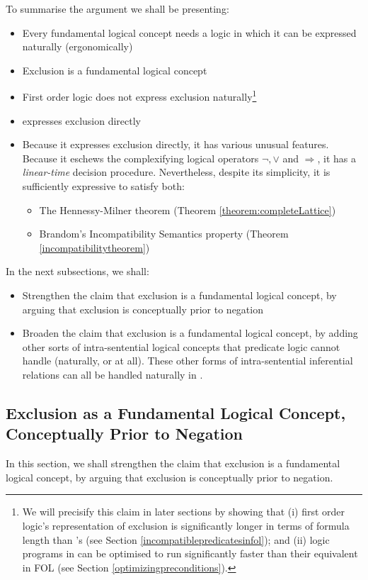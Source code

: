 To summarise the argument we shall be presenting:
\begin{itemize}
\item
Every fundamental logical concept needs a logic in which it can be expressed naturally (ergonomically)
\item
Exclusion is a fundamental logical concept
\item
First order logic does not express exclusion naturally\footnote{We will precisify this claim in later sections by showing that (i) first order logic's representation of exclusion is significantly longer in terms of formula length than \ELFULL{}'s (see Section \ref{incompatiblepredicatesinfol}); and (ii) logic programs in \ELFULL{} can be optimised to run significantly faster than their equivalent in FOL (see Section \ref{optimizingpreconditions}).}
\item
\ELFULL{} expresses exclusion directly
\item
Because it expresses exclusion directly, it has various unusual features. 
Because it eschews the complexifying logical operators $\neg, \lor$ and $\Rightarrow$, it has a \emph{linear-time} decision procedure. 
Nevertheless, despite its simplicity, it is sufficiently expressive to satisfy both:
\begin{itemize}
\item
The Hennessy-Milner theorem (Theorem \ref{theorem:completeLattice})
\item
Brandom's Incompatibility Semantics property (Theorem \ref{incompatibilitytheorem})
\end{itemize}
\end{itemize}
In the next subsections, we shall:
\begin{itemize}
\item
Strengthen the claim that exclusion is a fundamental logical concept, by arguing that exclusion is conceptually prior to negation
\item
Broaden the claim that exclusion is a fundamental logical concept, by adding other sorts of intra-sentential logical concepts that predicate logic cannot handle (naturally, or at all). These other forms of intra-sentential inferential relations can all be handled naturally in \ELFULL{}.
\end{itemize}

\subsection{Exclusion as a Fundamental Logical Concept, Conceptually Prior to Negation}
In this section, we shall strengthen the claim that exclusion is a fundamental logical concept, by arguing that exclusion is conceptually prior to negation.

